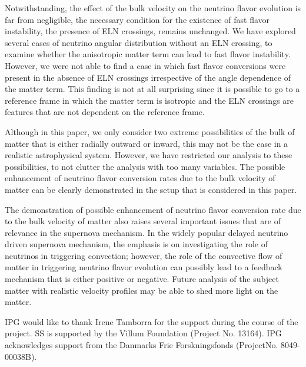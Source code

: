 \documentclass[aps, prd, 10pt, twocolumn, superscriptaddress, noshowpacs, preprintnumbers, longbibliography, groupedaddress, footinbib, bibnotes]{revtex4-1}
\begin{document}
Notwithstanding, the effect of the bulk velocity on the neutrino flavor evolution is far from negligible, the necessary condition for the existence of fast flavor instability, the presence of ELN crossings, remains unchanged. We have explored several cases of neutrino angular distribution without an ELN crossing, to examine whether the anisotropic matter term can lead to fast flavor instability. However, we were not able to find a case in which fast flavor conversions were present in the absence of ELN crossings irrespective of the angle dependence of the matter term. This finding is not at all surprising since it is possible to go to a reference frame in which the matter term is isotropic and the ELN crossings are features that are not dependent on the reference frame. 

Although in this paper, we only consider two extreme possibilities of the bulk of matter that is either radially outward or inward, this may not be the case in a realistic astrophysical system. However, we have restricted our analysis to these possibilities, to not clutter the analysis with too many variables. The possible enhancement of neutrino flavor conversion rates due to the bulk velocity of matter can be clearly demonstrated in the setup that is considered in this paper.

The demonstration of possible enhancement of neutrino flavor conversion rate due to the bulk velocity of matter also raises several important issues that are of relevance in the supernova mechanism. In the widely popular delayed neutrino driven supernova mechanism, the emphasis is on investigating the role of neutrinos in triggering convection; however, the role of the convective flow of matter in triggering neutrino flavor evolution can possibly lead to a feedback mechanism that is either positive or negative. Future analysis of the subject matter with realistic velocity profiles may be able to shed more light on the matter. 

  

\acknowledgments 
IPG would like to thank Irene Tamborra for the support during the course of the project. SS is supported by the Villum Foundation (Project No. 13164). IPG acknowledges support from the Danmarks Frie Forskningsfonds (ProjectNo. 8049-00038B). 











\appendix


\end{document}
